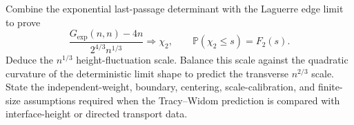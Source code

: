 \begin{exercise}
Combine the exponential last-passage determinant with the Laguerre edge limit
to prove
\[
\frac{G_{\exp}(n,n)-4n}{2^{4/3}n^{1/3}}
\Longrightarrow\chi_2,
\qquad
\mathbb P(\chi_2\leq s)=F_2(s).
\]
Deduce the $n^{1/3}$ height-fluctuation scale.  Balance this scale against
the quadratic curvature of the deterministic limit shape to predict the
transverse $n^{2/3}$ scale.  State the independent-weight, boundary,
centering, scale-calibration, and finite-size assumptions required when
the Tracy--Widom prediction is compared with interface-height or directed
transport data.
\end{exercise}
